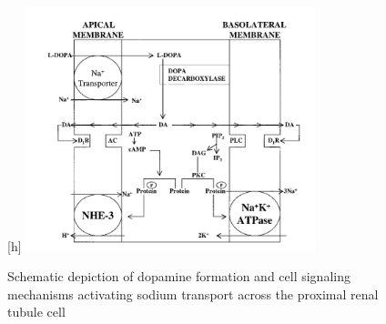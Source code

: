 \documentclass[smallextended]{svjour3}
\begin{document}
\begin{figure}
\label{fig:3}[h]
 \includegraphics[width=0.75\textwidth]{Schematic_Renal_Dopamine.png}   
   \caption{Schematic depiction of dopamine formation and cell signaling mechanisms activating sodium transport across the proximal renal tubule cell \cite{Ref30}}
  \centering
\end{figure} 

\end{document}
